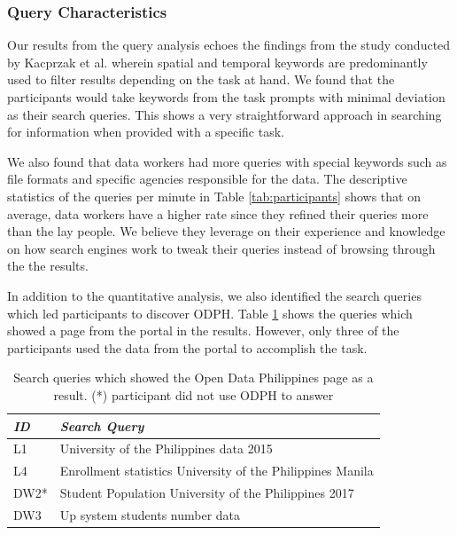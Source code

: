 \documentclass{sigchi}
\begin{document}

\subsubsection{Query Characteristics}
Our results from the query analysis echoes the findings from the study conducted by Kacprzak et al. \cite{kacprzak2019characterising} wherein spatial and temporal keywords are predominantly used to filter results depending on the task at hand. We found that the participants would take keywords from the task prompts with minimal deviation as their search queries. This shows a very straightforward approach in searching for information when provided with a specific task.

We also found that data workers had more queries with special keywords such as file formats and specific agencies responsible for the data. The descriptive statistics of the queries per minute in Table \ref{tab:participants} shows that on average, data workers have a higher rate since they refined their queries more than the lay people. We believe they leverage on their experience and knowledge on how search engines work to tweak their queries instead of browsing through the the results.

In addition to the quantitative analysis, we also identified the search queries which led participants to discover ODPH. Table \ref{tab:ODPHqueries} shows the queries which showed a page from the portal in the results. However, only three of the participants used the data from the portal to accomplish the task.

\begin{table}[t]
  \centering
  \begin{tabular}{l p{6.75cm}}
    \toprule
     \textit{ID} & \textit{Search Query} \\
     \midrule
     L1 & University of the Philippines data 2015 \\
     L4 & Enrollment statistics University of the Philippines Manila \\
     DW2* & Student Population University of the Philippines 2017 \\
     DW3 & Up system students number data \\
     \bottomrule
  \end{tabular}
  \caption{Search queries which showed the Open Data Philippines page as a result. (*) participant did not use ODPH to answer}
  \label{tab:ODPHqueries}
\end{table}
\end{document}
